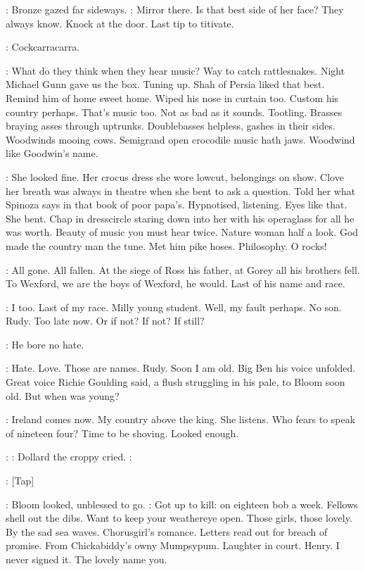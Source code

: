 :
Bronze gazed far sideways.
\BloomInt:
Mirror there.
Is that best side of her face?
They always know.
Knock at the door.
Last tip to titivate.

\BloomInt:
Cockcarracarra.

\BloomInt:
What do they think when they hear music?
Way to catch rattlesnakes.
Night Michael Gunn gave us the box.
Tuning up.
Shah of Persia liked that
best.
Remind him of home sweet home.
Wiped his nose in curtain too.
Custom his country perhaps.
That's music too.
Not as bad as it sounds.
Tootling.
Brasses braying asses through uptrunks.
Doublebasses helpless,
gashes in their sides.
Woodwinds mooing cows.
Semigrand open crocodile
music hath jaws.
Woodwind like Goodwin's name.

\BloomInt:
She looked fine.
Her crocus dress she wore lowcut,
belongings on
show.
Clove her breath was always in theatre when she bent to ask a
question.
Told her what Spinoza says in that book of poor papa's.
Hypnotised,
listening.
Eyes like that.
She bent.
Chap in dresscircle
staring down into her with his operaglass for all he was worth.
Beauty of music you must hear twice.
Nature woman half a look.
God made the
country man the tune.
Met him pike hoses.
Philosophy.
O rocks!

\BloomInt:
All gone.
All fallen.
At the siege of Ross his father,
at Gorey all his
brothers fell.
To Wexford,
we are the boys of Wexford,
he would.
Last of
his name and race.

\BloomInt:
I too.
Last of my race.
Milly young student.
Well,
my fault perhaps.
No son.
Rudy.
Too late now.
Or if not?
If not?
If still?

\BloomInt:
He bore no hate.

\BloomInt:
Hate.
Love.
Those are names.
Rudy.
Soon I am old.
Big Ben his voice
unfolded.
Great voice Richie Goulding said,
a flush struggling in his
pale,
to Bloom soon old.
But when was young?

\BloomInt:
Ireland comes now.
My country above the king.
She listens.
Who
fears to speak of nineteen four?
Time to be shoving.
Looked enough.

\dollard:
:
Dollard the croppy cried.
\dollard:

\stripling:
[Tap]

:
Bloom looked,
unblessed to go.
\BloomInt:
Got up to kill:
on eighteen bob a
week.
Fellows shell out the dibs.
Want to keep your weathereye open.
Those
girls,
those lovely.
By the sad sea waves.
Chorusgirl's romance.
Letters
read out for breach of promise.
From Chickabiddy's owny Mumpsypum.
Laughter in court.
Henry.
I never signed it.
The lovely name you.

